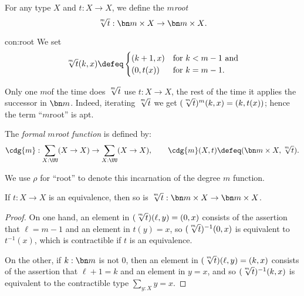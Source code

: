 \begin{construction}\label{con:root}
  For any type $X$ and $t:X\to X$, we define the $m$\th \emph{root}
  \[
    {\textstyle\sqrt[\uproot{2}m]t} : {\bn m\times X} \to {\bn m\times X}.
  \]
\end{construction}
\begin{implementation}{con:root}
  We set
  \[
    {\textstyle\sqrt[\uproot{2}m]t}(k,x)\defeq
    \begin{cases}
      (k+1,x)& \text{for $k<m-1$ and}\\
      (0,t(x))& \text{for $k=m-1$}.
    \end{cases}
  \]
\par \vspace{-1.5\baselineskip}
\qedhere
\end{implementation}
Only one $m$\th of the time does $\sqrt[\uproot{2}m]t$ use $t:X\to X$,
the rest of the time it applies the successor in $\bn m$.
Indeed, iterating $\sqrt[\uproot{2}m]t$
we get $(\sqrt[\uproot{2}m]t)^m(k,x)=(k,t(x))$;
hence the term ``$m$\th root'' is apt.

\begin{definition}
  The \emph{formal $m$\th root function} is defined by:
  \[
    \cdg{m}:\sum_{X:\UU}(X\to X)\to\sum_{X:\UU}(X\to X),\qquad
    \cdg{m}(X,t)\defeq(\bn m\times X,{\textstyle\sqrt[\uproot{2}m]t}).\qedhere
  \]
\end{definition}
\noindent We use $\rho$ for ``root'' to denote this incarnation
of the degree $m$ function.

\begin{lemma}\label{lem:root-pres-equiv}
  If $t:X\to X$ is an equivalence,
  then so is $\sqrt[\uproot{2}m]t : \bn m\times X \to \bn m\times X$.
\end{lemma}
\begin{proof}
  On one hand, an element in  $(\sqrt[\uproot{2}m]t)(\ell,y) = (0,x)$ consists
  of the assertion that  $\ell=m-1$ and an element in $t(y)=x$,
  so  $(\sqrt[\uproot{2}m]t)^{-1}(0,x)$ is equivalent
  to $t^{-1}(x)$, which is contractible if $t$ is an equivalence.

  On the other, if $k:\bn m$ is not $0$,
  then an element in $(\sqrt[\uproot{2}m]t)(\ell,y)=(k,x)$
  consists of the assertion that $\ell+1=k$ and an element in $y=x$,
  and so $(\sqrt[\uproot{2}m]t)^{-1}(k,x)$ is equivalent
  to the contractible type $\sum_{y:X}y=x$.
\end{proof}

